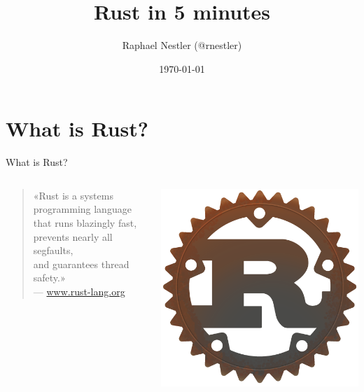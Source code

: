 \documentclass[aspectratio=1610,t]{beamer}
\title{Rust in 5 minutes}
\date{\today}
\author{Raphael Nestler (@rnestler)}
\institute{Coredump Rapperswil}
\begin{document}
\maketitle



\section{What is Rust?}

\begin{frame}[c]{What is Rust?}
  \begin{columns}[onlytextwidth]
    \begin{column}{.8\textwidth}
      \begin{quote}
        «Rust is a systems programming language\\
        that runs blazingly fast, prevents nearly all segfaults,\\
        and guarantees thread safety.»\\
        \vspace{0.5em}
        {\normalfont \small --- \url{www.rust-lang.org}}
      \end{quote}
    \end{column}
    \begin{column}{.2\textwidth}
      \includegraphics[width=\textwidth]{./rust-logo-512x512.png}
    \end{column}
  \end{columns}
\end{frame}
\end{document}
